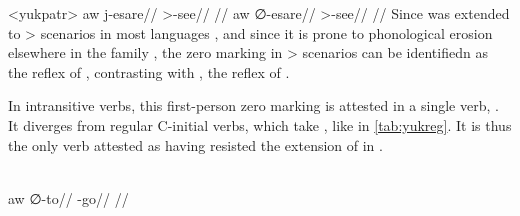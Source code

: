 \pex<yukpatr>\yukpa \parencite[][139]{meira2006syntactic}
\begingl
\gla aw j-esare//
\glb {} >-see//
\glft {}//
\endgl
{}
\begingl
\gla aw {\normalfont ∅}-esare//
\glb {} >-see//
\glft {}//
\endgl
\xe
%
Since \PC {}  was extended to > scenarios in most languages \parencite[81--82]{gildea1998}, and since it is prone to phonological erosion elsewhere in the family , the zero marking in > scenarios can be identifiedn  as the \yukpa reflex of , contrasting with , the reflex of .

In intransitive verbs, this first-person zero marking is attested in a single verb,   .
It diverges from regular C-initial verbs, which take , like  in \cref{tab:yukreg}.
It is thus the only verb attested as having resisted the extension of  in \yukpa.

\yukpa \parencite[][139]{meira2006syntactic}\\
\begingl
\gla aw {\normalfont ∅}-to//
\glb {} -go//
\glft {}//
\endgl
\xe


